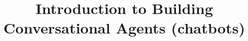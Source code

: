 \documentclass[xcolor=dvipsnames,compress,t,pdf,9pt]{beamer}
\title[\insertframenumber /\inserttotalframenumber]{Introduction to Building Conversational Agents (chatbots)}
\begin{document}
	\begin{frame}
	\titlepage
	\end{frame}
	
%	
	
	
\end{document}
